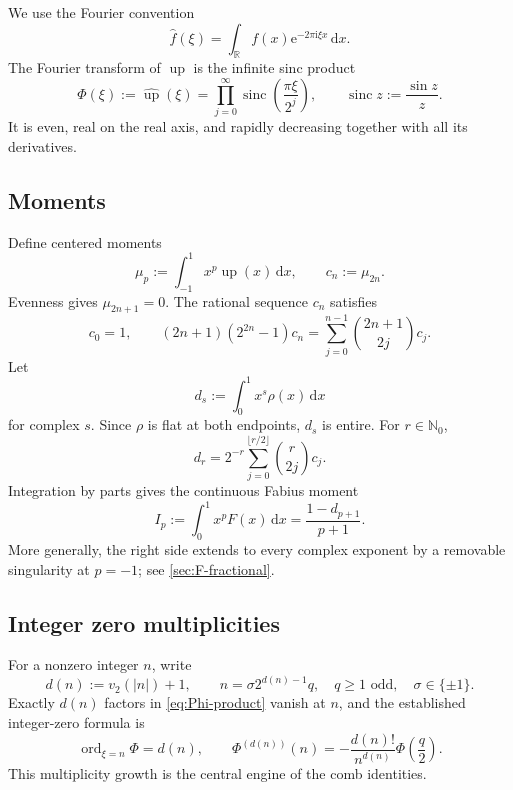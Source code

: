 \documentclass[11pt]{article}
\theoremstyle{definition}
\DeclareMathOperator{\sinc}{sinc}
\DeclareMathOperator{\ord}{ord}
\newcommand{\Up}{\operatorname{up}}
\newcommand{\dd}{\,\mathrm{d}}
\newcommand{\e}{\mathrm{e}}
\newcommand{\ii}{\mathrm{i}}
\newcommand{\N}{\mathbb{N}}
\newcommand{\R}{\mathbb{R}}
\begin{document}
We use the Fourier convention
\[
 \widehat f(\xi)=\int_{\R}f(x)\e^{-2\pi\ii\xi x}\dd x.
\]
The Fourier transform of $\Up$ is the infinite sinc product
\begin{equation}
 \Phi(\xi):=\widehat{\Up}(\xi)
 =\prod_{j=0}^{\infty}\sinc\!\left(\frac{\pi\xi}{2^j}\right),
 \qquad \sinc z:=\frac{\sin z}{z}.
 \label{eq:Phi-product}
\end{equation}
It is even, real on the real axis, and rapidly decreasing together with all
its derivatives.

\subsection{Moments}

Define centered moments
\begin{equation}
 \mu_p:=\int_{-1}^{1}x^p\Up(x)\dd x,
 \qquad
 c_n:=\mu_{2n}.
 \label{eq:mu-c}
\end{equation}
Evenness gives $\mu_{2n+1}=0$.  The rational sequence $c_n$ satisfies
\begin{equation}
 c_0=1,
 \qquad
 (2n+1)(2^{2n}-1)c_n
 =\sum_{j=0}^{n-1}\binom{2n+1}{2j}c_j.
 \label{eq:c-recurrence}
\end{equation}
Let
\begin{equation}
 d_s:=\int_0^1 x^s\rho(x)\dd x
 \label{eq:d-complex}
\end{equation}
for complex $s$.  Since $\rho$ is flat at both endpoints, $d_s$ is entire.
For $r\in\N_0$,
\begin{equation}
 d_r=2^{-r}\sum_{j=0}^{\lfloor r/2\rfloor}\binom r{2j}c_j.
 \label{eq:d-from-c}
\end{equation}
Integration by parts gives the continuous Fabius moment
\begin{equation}
 I_p:=\int_0^1x^pF(x)\dd x=\frac{1-d_{p+1}}{p+1}.
 \label{eq:F-continuous-moment}
\end{equation}
More generally, the right side extends to every complex exponent by a
removable singularity at $p=-1$; see \cref{sec:F-fractional}.

\subsection{Integer zero multiplicities}

For a nonzero integer $n$, write
\[
 d(n):=v_2(|n|)+1,
 \qquad n=\sigma 2^{d(n)-1}q,
 \quad q\ge1\text{ odd},\quad \sigma\in\{\pm1\}.
\]
Exactly $d(n)$ factors in \eqref{eq:Phi-product} vanish at $n$, and the
established integer-zero formula is
\begin{equation}
 \ord_{\xi=n}\Phi=d(n),
 \qquad
 \Phi^{(d(n))}(n)
 =-\frac{d(n)!}{n^{d(n)}}\Phi\!\left(\frac q2\right).
 \label{eq:integer-leading-jet}
\end{equation}
This multiplicity growth is the central engine of the comb identities.
\end{document}
